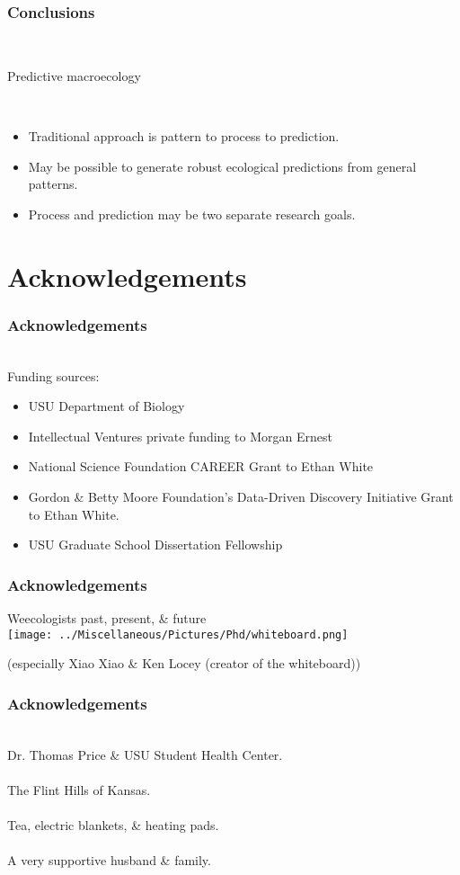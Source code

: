\documentclass[14pt]{beamer}
\begin{document}
\begin{frame}[t]{}
\frametitle{Conclusions}\
~\\ 
\begin{large}
Predictive macroecology
\end{large}
~\\ 
\begin{itemize}
\item Traditional approach is pattern to process to prediction.
\item May be possible to generate robust ecological predictions from general patterns.
\item Process and prediction may be two separate research goals.
\end{itemize} 
\end{frame}

\section{Acknowledgements}
\begin{frame}[t]{}
\frametitle{Acknowledgements}
~\\ %
\small{Funding sources:}
\begin{tiny}
\begin{itemize}
\item USU Department of Biology
\item Intellectual Ventures private funding to Morgan Ernest
\item National Science Foundation CAREER Grant to Ethan White
\item Gordon \& Betty Moore Foundation's Data-Driven Discovery Initiative Grant to Ethan White.
\item USU Graduate School Dissertation Fellowship
\end{itemize}
\end{tiny}
\end{frame}

\begin{frame}{}
\frametitle{Acknowledgements}
Weecologists past, present, \& future\\
\texttt{[image: ../Miscellaneous/Pictures/Phd/whiteboard.png]}
\begin{tiny}
(especially Xiao Xiao \& Ken Locey (creator of the whiteboard))
\end{tiny}
\end{frame}

\begin{frame}[t]{}
\frametitle{Acknowledgements}
~\\ %
Dr. Thomas Price \& USU Student Health Center.\\
~\\
The Flint Hills of Kansas.\\
~\\
Tea, electric blankets, \& heating pads.\\
~\\
A very supportive husband \& family.\\
\end{frame}
\end{document}

